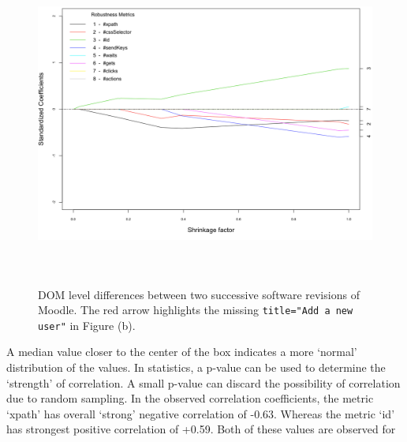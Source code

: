 \begin{figure}[ht!] 
\centering     %
{\label{rob:amo}\includegraphics[width=13cm,height=10cm]{./Figures/moodlelasso}}
  \captionsetup{justification=justified,
singlelinecheck=false}
\caption{DOM level differences between two successive software revisions of Moodle. The red arrow highlights the missing \texttt{title="Add a new user"} in Figure (b). }
\label{fig:lasso1}
\end{figure} 
A median value closer to the center of the box indicates a more `normal' distribution of the values. In statistics, a p-value can be used to determine the `strength' of correlation. A small p-value can discard the possibility of correlation due to random sampling. In the observed correlation coefficients, the metric `xpath' has overall `strong' negative correlation of -0.63. Whereas the metric `id' has strongest positive correlation of +0.59. Both of these values are observed for 


